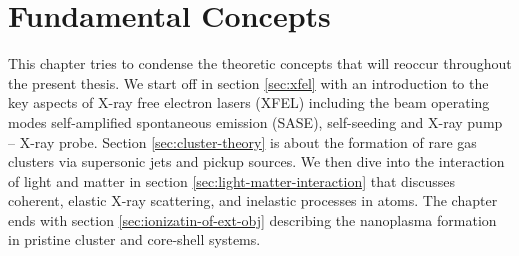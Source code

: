 \chapter{Fundamental Concepts}\label{ch:fundamental_concepts}
This chapter tries to condense the theoretic concepts that will reoccur throughout the present thesis. We start off in section \ref{sec:xfel} with an introduction to the key aspects of X-ray free electron lasers (XFEL) including the beam operating modes self-amplified spontaneous emission (SASE), self-seeding and X-ray pump -- X-ray probe. Section \ref{sec:cluster-theory} is about the formation of rare gas clusters via supersonic jets and pickup sources. We then dive into the interaction of light and matter in section \ref{sec:light-matter-interaction} that discusses coherent, elastic X-ray scattering, and inelastic processes in atoms. The chapter ends with section \ref{sec:ionizatin-of-ext-obj} describing the nanoplasma formation in pristine cluster and core-shell systems.
%
%
%

